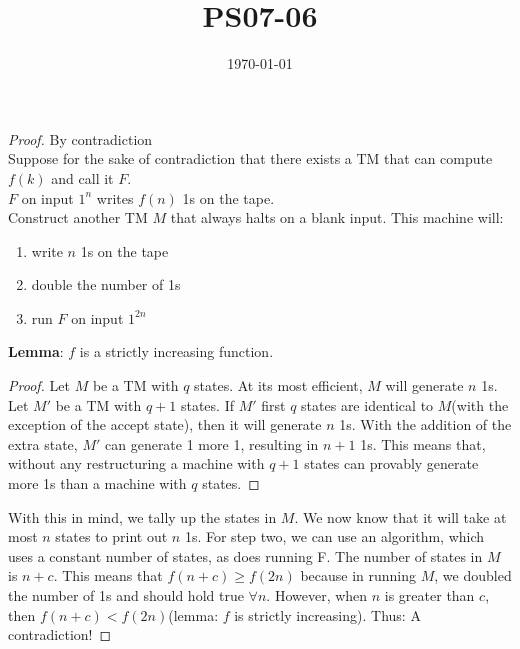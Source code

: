 \documentclass{article}
\title{PS07-06}
\date{\today}
\begin{document}
\maketitle
\begin{proof}
By contradiction\\
Suppose for the sake of contradiction that there exists a TM that can compute $f(k)$ and call it $F$.\\
$F$ on input $1^n$ writes $f(n)$ 1s on the tape.\\
Construct another TM $M$ that always halts on a blank input. This machine will:
\begin{enumerate}
	\item write $n$ 1s on the tape
	\item double the number of 1s
	\item run $F$ on input $1^{2n}$
\end{enumerate}
\textbf{Lemma}: $f$ is a strictly increasing function.
\begin{proof}
Let $M$ be a TM with $q$ states. At its most efficient, $M$ will generate $n$ 1s. Let $M'$ be a TM with $q+1$ states. If $M'$ first $q$ states are identical to $M$(with the exception of the accept state), then it will generate $n$ 1s. With the addition of the extra state, $M'$ can generate 1 more 1, resulting in $n+1$ 1s. This means that, without any restructuring a machine with $q+1$ states can provably generate more 1s than a machine with $q$ states.
\end{proof}
With this in mind, we tally up the states in $M$. We now know that it will take at most $n$ states to print out $n$ 1s. For step two, we can use an algorithm, which uses a constant number of states, as does running F. The number of states in $M$ is $n+c$. This means that $f(n+c) \geq f(2n)$ because in running $M$, we doubled the number of 1s and should hold true $\forall n$. However, when $n$ is greater than $c$, then $f(n+c) < f(2n)$(lemma: $f$ is strictly increasing). Thus: A contradiction!
\end{proof}
\end{document}
